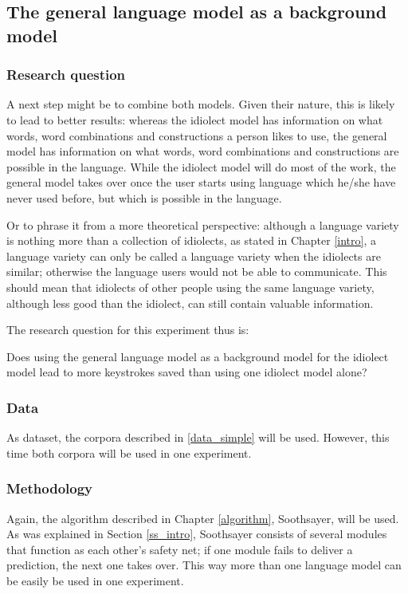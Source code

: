 \documentclass[11pt]{article}
\begin{document}
\subsection{The general language model as a background model} \label{background}

\subsubsection{Research question}

A next step might be to combine both models. Given their nature, this is likely to lead to better results: whereas the idiolect model has information on what words, word combinations and constructions a person likes to use, the general model has information on what words, word combinations and constructions are possible in the language. While the idiolect model will do most of the work, the general model takes over once the user starts using language which he/she have never used before, but which is possible in the language. 

Or to phrase it from a more theoretical perspective: although a language variety is nothing more than a collection of idiolects, as stated in Chapter \ref{intro}, a language variety can only be called a language variety when the idiolects are similar; otherwise the language users would not be able to communicate. This should mean that idiolects of other people using the same language variety, although less good than the idiolect, can still contain valuable information.

The research question for this experiment thus is:

\begin{examples}

\item Does using the general language model as a background model for the idiolect model lead to more keystrokes saved than using one idiolect model alone?

\end{examples}

\subsubsection{Data}
As dataset, the corpora described in \ref{data_simple} will be used. However, this time  both corpora will be used in one experiment.

\subsubsection{Methodology}
Again, the algorithm described in Chapter \ref{algorithm}, Soothsayer, will be used. As was explained in Section \ref{ss_intro}, Soothsayer consists of several modules that function as each other's safety net; if one module fails to deliver a prediction, the next one takes over. This way more than one language model can be easily be used in one experiment.
\end{document}
